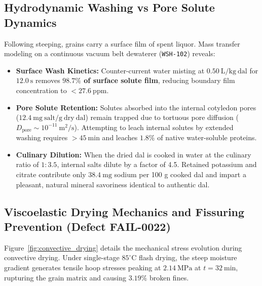 \documentclass[10pt,a4paper]{article}
\begin{document}
\subsection{Hydrodynamic Washing vs Pore Solute Dynamics}
Following steeping, grains carry a surface film of spent liquor. Mass transfer modeling on a continuous vacuum belt dewaterer (\texttt{WSH-102}) reveals:
\begin{itemize}[leftmargin=1.5em]
    \item \textbf{Surface Wash Kinetics:} Counter-current water misting at $0.50\ \mathrm{L/kg\ dal}$ for $12.0\ \mathrm{s}$ removes \textbf{$98.7\%$ of surface solute film}, reducing boundary film concentration to $< 27.6\ \mathrm{ppm}$.
    \item \textbf{Pore Solute Retention:} Solutes absorbed into the internal cotyledon pores ($12.4\ \mathrm{mg\ salt/g\ dry\ dal}$) remain trapped due to tortuous pore diffusion ($D_{\mathrm{pore}} \sim 10^{-11}\ \mathrm{m^2/s}$). Attempting to leach internal solutes by extended washing requires $> 45\ \mathrm{min}$ and leaches $1.8\%$ of native water-soluble proteins.
    \item \textbf{Culinary Dilution:} When the dried dal is cooked in water at the culinary ratio of $1:3.5$, internal salts dilute by a factor of 4.5. Retained potassium and citrate contribute only $38.4\ \mathrm{mg}$ sodium per 100 g cooked dal and impart a pleasant, natural mineral savoriness identical to authentic dal.
\end{itemize}

\subsection{Viscoelastic Drying Mechanics and Fissuring Prevention (Defect FAIL-0022)}
Figure~\ref{fig:convective_drying} details the mechanical stress evolution during convective drying. Under single-stage $85^\circ\mathrm{C}$ flash drying, the steep moisture gradient generates tensile hoop stresses peaking at $2.14\ \mathrm{MPa}$ at $t = 32\ \mathrm{min}$, rupturing the grain matrix and causing $3.19\%$ broken fines.
\end{document}
